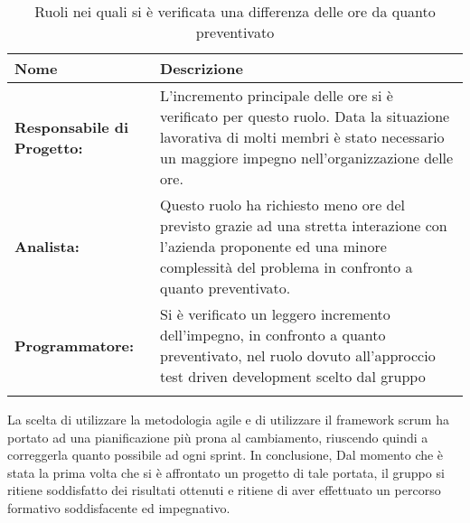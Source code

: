 \setlength{\freewidth}{\dimexpr\textwidth-0\tabcolsep}
	\renewcommand{\arraystretch}{1.5}
	\setlength{\aboverulesep}{0pt}
	\setlength{\belowrulesep}{0pt}
	\begin{longtable}{L{.210\freewidth} L{.6\freewidth} }
		\toprule 
		\textbf{Nome} & \textbf{Descrizione} \\
		\hline
		\textbf{Responsabile di Progetto:} & L'incremento principale delle ore si è verificato per questo ruolo. Data la situazione lavorativa di molti membri è stato necessario un maggiore impegno nell'organizzazione delle ore. \\
				\textbf{Analista:} & Questo ruolo ha richiesto meno ore del previsto grazie ad una stretta interazione con l'azienda proponente ed una minore complessità del problema in confronto a quanto preventivato. \\
		\textbf{Programmatore:} & Si è verificato un leggero incremento dell'impegno, in confronto a quanto preventivato, nel ruolo dovuto all'approccio test driven development scelto dal gruppo \\	
		\endhead		
		\hiderowcolors
		\caption{Ruoli nei quali si è verificata una differenza delle ore da quanto preventivato}
	\end{longtable}	
La scelta di utilizzare la metodologia agile e di utilizzare il framework scrum ha portato ad una pianificazione più prona al cambiamento, riuscendo quindi a correggerla quanto possibile ad ogni sprint. In conclusione, Dal momento che è stata la prima volta che si è affrontato un progetto di tale portata, il gruppo si ritiene soddisfatto dei risultati ottenuti e ritiene di aver effettuato un percorso formativo soddisfacente ed impegnativo.
	
